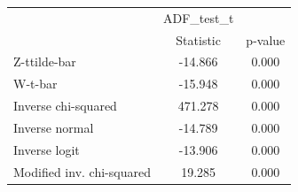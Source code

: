 \begin{tabular}{l*{2}{c}}
\hline\hline
            &  ADF\_test\_t&            \\
            &   Statistic&     p-value\\
\hline
Z-ttilde-bar&     -14.866&       0.000\\
W-t-bar     &     -15.948&       0.000\\
Inverse chi-squared&     471.278&       0.000\\
Inverse normal&     -14.789&       0.000\\
Inverse logit&     -13.906&       0.000\\
Modified inv. chi-squared&      19.285&       0.000\\
\hline\hline
\end{tabular}
